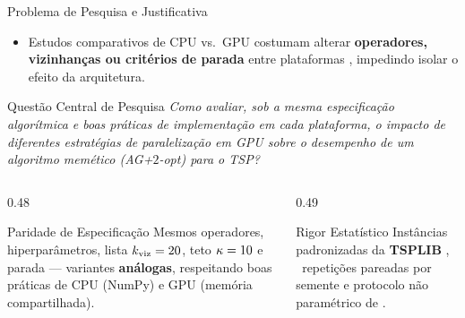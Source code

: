 \begin{frame}{Problema de Pesquisa e Justificativa}
  \begin{itemize}
    \item Estudos comparativos de CPU vs.\ GPU costumam alterar \textbf{operadores, vizinhanças ou critérios de parada} entre plataformas \autocite{schulz2013gpu,van2013gpu,benaini2018genetic}, impedindo isolar o efeito da arquitetura.
  \end{itemize}

  \vspace{0.12cm}
  \begin{alertblock}{Questão Central de Pesquisa}
    \emph{Como avaliar, sob a mesma especificação algorítmica e boas práticas de implementação em cada plataforma, o impacto de diferentes estratégias de paralelização em GPU sobre o desempenho de um algoritmo memético (AG+$2$-opt) para o TSP?}
  \end{alertblock}

  \vspace{0.12cm}
  \begin{columns}[T,onlytextwidth]
    \begin{column}{0.48\textwidth}
      \begin{block}{Paridade de Especificação}
        Mesmos operadores, hiperparâmetros, lista $k_{\text{viz}} = 20$, teto $\kappa = 10$ e parada — variantes \textbf{análogas}, respeitando boas práticas de CPU (NumPy) e GPU (memória compartilhada).
      \end{block}
    \end{column}
    \begin{column}{0.49\textwidth}
      \begin{block}{Rigor Estatístico}
        Instâncias padronizadas da \textbf{TSPLIB} \autocite{reinelt1991tsplib}, \totalrepeticoes\ repetições pareadas por semente e protocolo não paramétrico de \textcite{demsar2006statistical}.
      \end{block}
    \end{column}
  \end{columns}
\end{frame}

